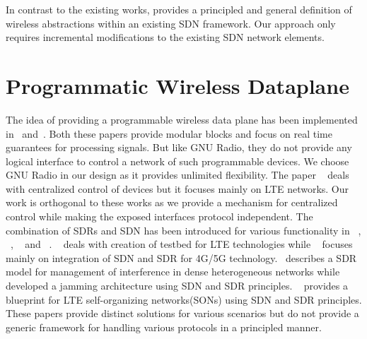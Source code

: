 In contrast to the existing works, \aetherflow  provides a principled and general definition of wireless abstractions within an existing SDN framework. Our approach only requires incremental modifications to the existing SDN network elements.

\section{Programmatic Wireless Dataplane} 
The idea of providing a programmable wireless data plane has been implemented in~\cite{atomix} and~\cite{openradio}. Both these papers provide modular blocks and focus on real time guarantees for processing signals. But like GNU Radio, they do not provide any logical interface to control a network of such programmable devices. We choose GNU Radio in our design as it provides unlimited flexibility. The paper ~\cite{softran} deals with centralized control of devices but it focuses mainly on LTE networks. Our work is orthogonal to these works as we provide a mechanism for centralized control while making the exposed interfaces protocol independent.
The combination of SDRs and SDN has been introduced for various functionality in ~\cite{cho2014integration, sun2015integrating}, ~\cite{mancuso2014prototyping}, ~\cite{corbett2014countering} and ~\cite{sdnsdrinsno}. ~\cite{mancuso2014prototyping} deals with creation of testbed for LTE technologies while ~\cite{cho2014integration, sun2015integrating} focuses mainly on integration of SDN and SDR for 4G/5G technology.~\cite{gupta2015labview} describes a SDR model for management of interference in dense heterogeneous networks while ~\cite{corbett2014countering} developed a jamming architecture using SDN and SDR principles. ~\cite{sdnsdrinsno} provides a blueprint for LTE self-organizing networks(SONs) using SDN and SDR principles. These papers provide distinct solutions for various scenarios but do not provide a generic framework for handling various protocols in a principled manner.
